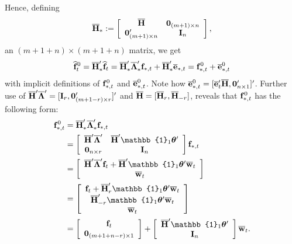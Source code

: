 \documentclass[12pt,fleqn]{article}
\begin{document}
Hence, defining
\begin{equation}
\overline{\mathbf{H}}_* :=  \left[ \begin{array}{cc}
                          \overline{\mathbf{H}} & \mathbf{0}_{(m+1)\times n}\\
                          \mathbf{0}_{(m+1)\times n}' & \mathbf{I}_{n}
                          \end{array}
\right],
\end{equation}
an $(m+1+n)\times (m+1+n)$ matrix, we get
\begin{align}
\widehat{\mathbf{f}}_{t}^0 = \overline{\mathbf{H}}_*'\widehat{\mathbf{f}}_{t}  = \overline{\mathbf{H}}_*'\overline{\boldsymbol{\Lambda}}_*'\mathbf{f}_{*,t} + \overline{\mathbf{H}}_*'\overline{\mathbf{e}}_{*,t}  = \mathbf{f}_{*,t}^0 + \overline{\mathbf{e}}_{*,t}^0
\end{align}
with implicit definitions of $\mathbf{f}_{*,t}^0$ and $\overline{\mathbf{e}}_{*,t}^0$. Note how $\overline{\mathbf{e}}_{*,t}^0 = [\overline{\mathbf{e}}_t'\overline{\mathbf{H}} , \mathbf{0}_{n\times 1}']'$. Further use of $\overline{\mathbf{H}}'\overline{\boldsymbol{\Lambda}}' = [\mathbf{I}_r,\mathbf{0}_{(m+1-r)\times r}']'$ and $\overline{\mathbf{H}} = [\overline{\mathbf{H}}_r, \overline{\mathbf{H}}_{-r}]$, reveals that $\mathbf{f}_{*,t}^0$ has the following form:
\begin{align}
\*{f}_{*,t}^0 &= \overline{\*H}_*'\overline{\+\Lambda}_*'\*{f}_{*,t} \notag\\
& = \left[ \begin{array}{cc}
                          \overline{\*H}'\overline{\+\Lambda}' & \overline{\*H}'\mathbb{1}_{1}\+\theta' \\
                          \*0_{n\times r} & \*I_{n}
                          \end{array}
\right] \*{f}_{*,t} \notag\\
&  =  \left[ \begin{array}{c}
                          \overline{\*H}'\overline{\+\Lambda}'\*{f}_t +  \overline{\*H}'\mathbb{1}_{1}\+\theta'\overline {\*w}_{t}   \\
                          \overline{\*{w}}_t
                          \end{array}
\right] \notag\\
& = \left[ \begin{array}{c}
                          \*{f}_t +  \overline{\*H}_r'\mathbb{1}_{1}\+\theta'\overline {\*w}_{t}  \\
                          \overline{\*H}_{-r}'\mathbb{1}_{1}\+\theta'\overline {\*w}_{t} \\
                          \overline{\*{w}}_t
                          \end{array}
\right] \notag\\
& =  \left[ \begin{array}{c}
                          \*{f}_t   \\
                          \*0_{(m+1+n-r)\times 1}
                          \end{array}
\right] + \left[ \begin{array}{c}
                          \overline{\*H}'\mathbb{1}_{1}\+\theta'   \\
                          \*I_n
                          \end{array}
\right]\overline {\*w}_{t}.
\end{align}
\end{document}
